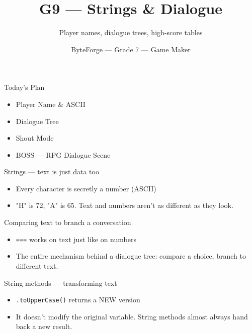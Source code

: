 \documentclass[aspectratio=169]{beamer}
\title{G9 — Strings \& Dialogue}
\subtitle{Player names, dialogue trees, high-score tables}
\author{ByteForge --- Grade 7 --- Game Maker}
\date{}
\begin{document}
\begin{frame}
    \titlepage
\end{frame}

\begin{frame}{Today's Plan}
    \begin{itemize}
        \item Player Name \& ASCII
        \item Dialogue Tree
        \item Shout Mode
        \item[$\bigstar$] BOSS --- RPG Dialogue Scene
    \end{itemize}
\end{frame}

\begin{frame}{Strings — text is just data too}
    \large
    \begin{itemize}
        \item Every character is secretly a number (ASCII)
        \item "H" is 72, "A" is 65. Text and numbers aren't as different as they look.
    \end{itemize}
\end{frame}


\begin{frame}{Comparing text to branch a conversation}
    \large
    \begin{itemize}
        \item \texttt{===} works on text just like on numbers
        \item The entire mechanism behind a dialogue tree: compare a choice, branch to different text.
    \end{itemize}

    \begin{center}
    \end{center}
\end{frame}


\begin{frame}{String methods — transforming text}
    \large
    \begin{itemize}
        \item \texttt{.toUpperCase()} returns a NEW version
        \item It doesn't modify the original variable. String methods almost always hand back a new result.
    \end{itemize}
\end{frame}
\end{document}
